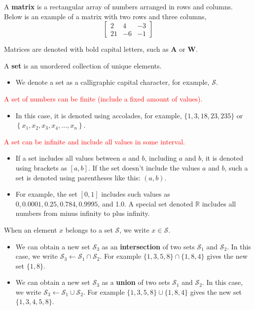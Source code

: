\documentclass[9pt,dvipsnames]{beamer}
\begin{document}
\begin{frame}
	A \textbf{matrix} is a rectangular array of numbers arranged in rows and columns. Below is an example of a matrix with two rows and three columns,
	$$
	\left[\begin{array}{ccc}
		2 & 4 & -3 \\
		21 & -6 & -1
	\end{array}\right]
	$$
	
	Matrices are denoted with bold capital letters, such as \(\mathbf{A}\) or \(\mathbf{W}\).
	
	A \textbf{set} is an unordered collection of unique elements. 
	\begin{itemize}
		\item We denote a set as a calligraphic capital character, for example, $\mathcal{S}$.
	\end{itemize}
	 \textcolor{red}{A set of numbers can be finite (include a fixed amount of values).} 
	 \begin{itemize}
	 	\item  In this case, it is denoted using accolades, for example, $\{1,3,18,23,235\}$ or $\left\{x_{1}, x_{2}, x_{3}, x_{4}, \ldots, x_{n}\right\}$. 
	 \end{itemize}
	
	 \textcolor{red}{A set can be infinite and include all values in some interval.}
	 \begin{itemize}
	 	\item If a set includes all values between $a$ and $b$, including $a$ and $b$, it is denoted using brackets as $[a, b]$. If the set doesn't include the values $a$ and $b$, such a set is denoted using parentheses like this: $(a, b)$. 
	 \end{itemize}

	 \begin{itemize}
	 	\item For example, the set $[0,1]$ includes such values as $0,0.0001,0.25,0.784,0.9995$, and 1.0. A special set denoted $\mathbb{R}$ includes all numbers from minus infinity to plus infinity.
	 \end{itemize}

\end{frame}

\begin{frame}
	When an element $x$ belongs to a set $\mathcal{S}$, we write $x \in \mathcal{S}$. 
	\begin{itemize}
		\item 	We can obtain a new set $\mathcal{S}_{3}$ as an \textbf{intersection} of two sets $\mathcal{S}_{1}$ and $\mathcal{S}_{2}$. In this case, we write $\mathcal{S}_{3} \leftarrow \mathcal{S}_{1} \cap \mathcal{S}_{2}$. For example $\{1,3,5,8\} \cap\{1,8,4\}$ gives the new set $\{1,8\}$.
		\item 	We can obtain a new set $\mathcal{S}_{3}$ as a \textbf{union} of two sets $\mathcal{S}_{1}$ and $\mathcal{S}_{2}$. In this case, we write $\mathcal{S}_{3} \leftarrow \mathcal{S}_{1} \cup \mathcal{S}_{2}$. For example $\{1,3,5,8\} \cup\{1,8,4\}$ gives the new set $\{1,3,4,5,8\}$.
	\end{itemize}
\end{frame}
\end{document}
